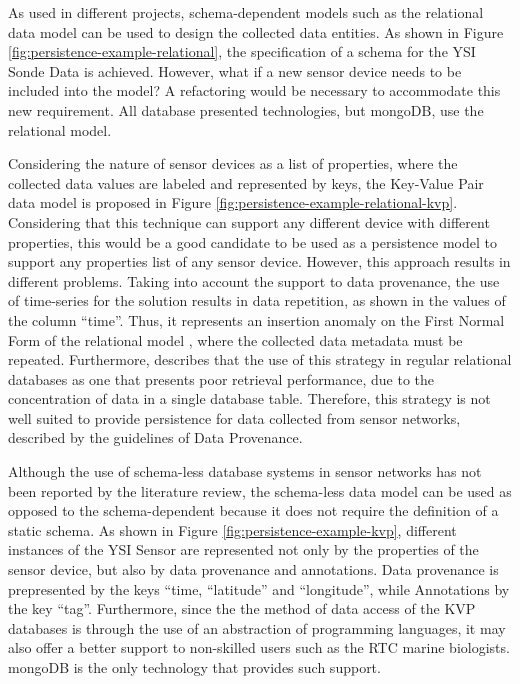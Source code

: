 As used in different projects, schema-dependent models such as the relational
data model can be used to design the collected data entities. As shown
in Figure \ref{fig:persistence-example-relational}, the specification of a
schema for the YSI Sonde Data is achieved. However, what if a new sensor device
needs to be included into the model? A refactoring would be necessary to
accommodate this new requirement. All database presented technologies, but
mongoDB, use the relational model.

Considering the nature of sensor devices as a list of properties, where the
collected data values are labeled and represented by keys, the Key-Value Pair
data model is proposed in Figure \ref{fig:persistence-example-relational-kvp}.
Considering that this technique can support any different device with
different properties, this would be a good candidate to be used as a
persistence model to support any properties list of any sensor device.
However, this approach results in different problems. Taking into account the
support to data provenance, the use of time-series for the solution results in
data repetition, as shown in the values of the column ``time''. Thus, it
represents an insertion anomaly on the First Normal Form of the relational model
\cite{relational-model}, where the collected data metadata must be repeated.
Furthermore, \cite{db-kvp-in-relational02} describes that the use of this
strategy in regular relational databases as one that presents poor retrieval
performance, due to the concentration of data in a single database table.
Therefore, this strategy is not well suited to provide persistence for data
collected from sensor networks, described by the guidelines of Data Provenance.

Although the use of schema-less database systems in sensor networks has not been
reported by the literature review, the schema-less data model can be used as
opposed to the schema-dependent because it does not require the definition of a
static schema. As shown in Figure \ref{fig:persistence-example-kvp}, different
instances of the YSI Sensor are represented not only by the properties of the
sensor device, but also by data provenance and annotations. Data provenance is
prepresented by the keys ``time, ``latitude'' and ``longitude'', while
Annotations by the key ``tag''. Furthermore, since the the method of data
access of the KVP databases is through the use of an abstraction of programming
languages, it may also offer a better support to non-skilled users such as the
RTC marine biologists. mongoDB is the only technology that provides such
support.

